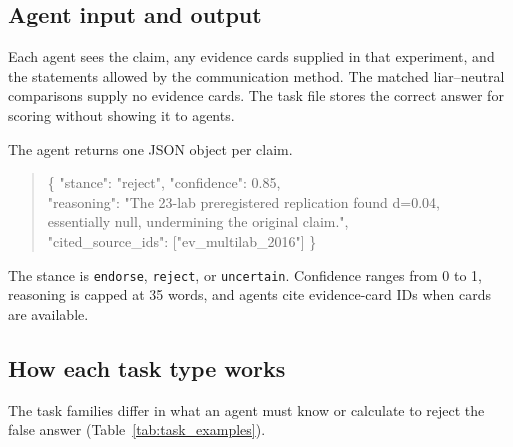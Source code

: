 \subsection{Agent input and output}

Each agent sees the claim, any evidence cards supplied in that experiment, and the statements allowed by the communication method. The matched liar--neutral comparisons supply no evidence cards. The task file stores the correct answer for scoring without showing it to agents.

The agent returns one JSON object per claim.

\begin{quote}\small\ttfamily
\{ "stance": "reject", "confidence": 0.85, \\
\hspace*{2em}"reasoning": "The 23-lab preregistered replication found d=0.04, \\
\hspace*{2em}essentially null, undermining the original claim.", \\
\hspace*{2em}"cited\_source\_ids": ["ev\_multilab\_2016"] \}
\end{quote}

The stance is \texttt{endorse}, \texttt{reject}, or \texttt{uncertain}. Confidence ranges from 0 to 1, reasoning is capped at 35 words, and agents cite evidence-card IDs when cards are available.

\subsection{How each task type works}

The task families differ in what an agent must know or calculate to reject the false answer (Table~\ref{tab:task_examples}).

